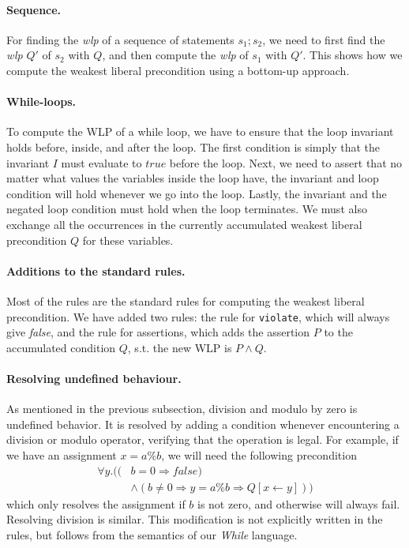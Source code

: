 \paragraph{Sequence.}
For finding the \textit{wlp} of a sequence of statements $s_1;s_2$, we need to first find the \textit{wlp} $Q'$ of $s_2$ with $Q$, and then compute the \textit{wlp} of $s_1$ with $Q'$.
This shows how we compute the weakest liberal precondition using a bottom-up approach.

\paragraph{While-loops.}
To compute the WLP of a while loop, we have to ensure that the loop invariant holds before, inside, and after the loop.
The first condition is simply that the invariant $I$ must evaluate to $true$ before the loop.
Next, we need to assert that no matter what values the variables inside the loop have, the invariant and loop condition will hold whenever we go into the loop.
Lastly, the invariant and the negated loop condition must hold when the loop terminates.
We must also exchange all the occurrences in the currently accumulated weakest liberal precondition $Q$ for these variables.

\paragraph{Additions to the standard rules.}
Most of the rules are the standard rules for computing the weakest liberal precondition.
We have added two rules: the rule for \texttt{violate}, which will always give \textit{false}, and the rule for assertions, which adds the assertion $P$ to the accumulated condition $Q$, s.t. the new WLP is $P \land Q$.

\paragraph{Resolving undefined behaviour.}
As mentioned in the previous subsection, division and modulo by zero is undefined behavior.
It is resolved by adding a condition whenever encountering a division or modulo operator, verifying that the operation is legal.
For example, if we have an assignment $x = a \% b$, we will need the following precondition
\begin{align*}
\forall y . ( (&b = 0 \Rightarrow false) \\
                &\land (b \neq 0 \Rightarrow y = a \% b \Rightarrow Q[x \leftarrow y]))
\end{align*}
which only resolves the assignment if $b$ is not zero, and otherwise will always fail. Resolving division is similar.
This modification is not explicitly written in the rules, but follows from the semantics of our \textit{While} language.

